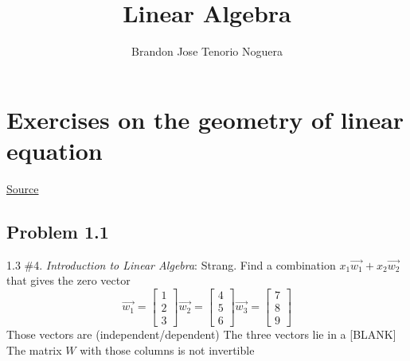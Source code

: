 \documentclass[12pt]{article}
\title{\textbf{Linear Algebra}}
\author{Brandon Jose Tenorio Noguera}
\begin{document}
\begin{titlingpage}
\maketitle
\end{titlingpage}

\newpage
\tableofcontents
\newpage

\section{Exercises on the geometry of linear equation}\label{p1}
\begin{tcolorbox}[title=Source]
\href{https://ocw.mit.edu/courses/18-06sc-linear-algebra-fall-2011/resources/mit18_06scf11_ses1-1prob/}{Source}
\end{tcolorbox}

\subsection{Problem 1.1}\label{p1.1}
\begin{tcolorbox}[title=Problem 1.1]
1.3 \#4. \emph{Introduction to Linear Algebra}: Strang. Find a combination $ x_1 \vec{w_1} + x_2 \vec{w_2} $ that gives the zero vector
  \begin{equation*}
    \vec{w_1} = \begin{bmatrix}
    1\\
    2\\
    3
    \end{bmatrix}
    \vec{w_2} = \begin{bmatrix}
    4\\
    5\\
    6
    \end{bmatrix}
    \vec{w_3} = \begin{bmatrix}
    7\\
    8\\
    9
    \end{bmatrix}
  \end{equation*}
  Those vectors are (independent/dependent)
  The three vectors lie in a [BLANK] 
  The matrix $ W $ with those columns is not invertible
\end{tcolorbox}
\end{document}
